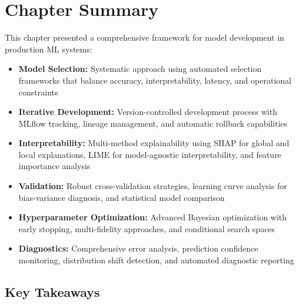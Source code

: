 \section{Chapter Summary}

This chapter presented a comprehensive framework for model development in production ML systems:

\begin{itemize}
    \item \textbf{Model Selection:} Systematic approach using automated selection frameworks that balance accuracy, interpretability, latency, and operational constraints

    \item \textbf{Iterative Development:} Version-controlled development process with MLflow tracking, lineage management, and automatic rollback capabilities

    \item \textbf{Interpretability:} Multi-method explainability using SHAP for global and local explanations, LIME for model-agnostic interpretability, and feature importance analysis

    \item \textbf{Validation:} Robust cross-validation strategies, learning curve analysis for bias-variance diagnosis, and statistical model comparison

    \item \textbf{Hyperparameter Optimization:} Advanced Bayesian optimization with early stopping, multi-fidelity approaches, and conditional search spaces

    \item \textbf{Diagnostics:} Comprehensive error analysis, prediction confidence monitoring, distribution shift detection, and automated diagnostic reporting
\end{itemize}

\subsection{Key Takeaways}


